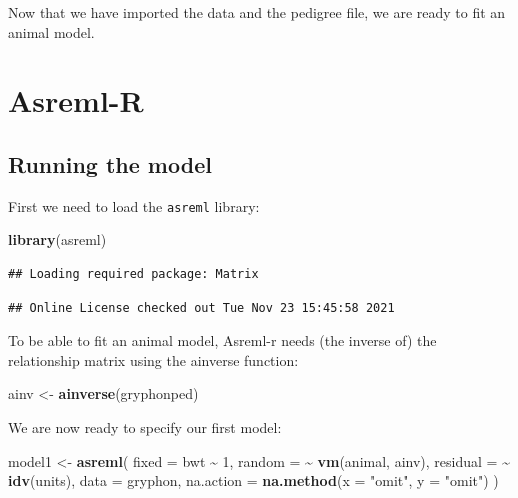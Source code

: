 \documentclass[
  12pt,
]{book}
\newenvironment{Shaded}{\begin{snugshade}}{\end{snugshade}}
\newcommand{\DataTypeTok}[1]{\textcolor[rgb]{0.13,0.29,0.53}{#1}}
\newcommand{\DecValTok}[1]{\textcolor[rgb]{0.00,0.00,0.81}{#1}}
\newcommand{\KeywordTok}[1]{\textcolor[rgb]{0.13,0.29,0.53}{\textbf{#1}}}
\newcommand{\NormalTok}[1]{#1}
\newcommand{\OperatorTok}[1]{\textcolor[rgb]{0.81,0.36,0.00}{\textbf{#1}}}
\newcommand{\StringTok}[1]{\textcolor[rgb]{0.31,0.60,0.02}{#1}}
\begin{document}
Now that we have imported the data and the pedigree file, we are ready to fit an animal model.

\hypertarget{asreml-r-1}{%
\section{Asreml-R}\label{asreml-r-1}}

\hypertarget{running-the-model}{%
\subsection{Running the model}\label{running-the-model}}

First we need to load the \texttt{asreml} library:

\begin{Shaded}
\begin{Highlighting}[]
\KeywordTok{library}\NormalTok{(asreml)}
\end{Highlighting}
\end{Shaded}

\begin{verbatim}
## Loading required package: Matrix
\end{verbatim}

\begin{verbatim}
## Online License checked out Tue Nov 23 15:45:58 2021
\end{verbatim}

To be able to fit an animal model, Asreml-r needs (the inverse of) the relationship matrix using the ainverse function:

\begin{Shaded}
\begin{Highlighting}[]
\NormalTok{ainv \textless{}{-}}\StringTok{ }\KeywordTok{ainverse}\NormalTok{(gryphonped)}
\end{Highlighting}
\end{Shaded}

We are now ready to specify our first model:

\begin{Shaded}
\begin{Highlighting}[]
\NormalTok{model1 \textless{}{-}}\StringTok{ }\KeywordTok{asreml}\NormalTok{(}
  \DataTypeTok{fixed =}\NormalTok{ bwt }\OperatorTok{\textasciitilde{}}\StringTok{ }\DecValTok{1}\NormalTok{, }\DataTypeTok{random =} \OperatorTok{\textasciitilde{}}\StringTok{ }\KeywordTok{vm}\NormalTok{(animal, ainv),}
  \DataTypeTok{residual =} \OperatorTok{\textasciitilde{}}\StringTok{ }\KeywordTok{idv}\NormalTok{(units),}
  \DataTypeTok{data =}\NormalTok{ gryphon,}
  \DataTypeTok{na.action =} \KeywordTok{na.method}\NormalTok{(}\DataTypeTok{x =} \StringTok{"omit"}\NormalTok{, }\DataTypeTok{y =} \StringTok{"omit"}\NormalTok{)}
\NormalTok{)}
\end{Highlighting}
\end{Shaded}
\end{document}
